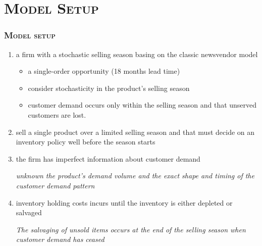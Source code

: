 \documentclass[aspectratio=169]{../presentation}
\begin{document}
    \section{\textsc{Model Setup}}

    \begin{frame}
        \frametitle{\textsc{Model setup}}

        \begin{enumerate}
            \item a firm with a stochastic selling season basing on the classic newsvendor model
            \begin{itemize}
                \scriptsize
                \item a single-order opportunity (18 months lead time)
                \item consider stochasticity in the product's selling season
                \item customer demand occurs only within the selling season and that unserved customers are lost.
            \end{itemize}
            \pause
            \item sell a single product over a limited selling season and that must decide on an inventory policy well before the season starts
            \pause
            \item the firm has imperfect information about customer demand

            {
                \scriptsize \textsl{
                    unknown the product's demand volume and the exact shape and timing of the customer demand pattern
                }
            }
            \pause
            \item inventory holding costs incurs until the inventory is either depleted or salvaged

            {
                \scriptsize \textsl{
                    The salvaging of unsold items occurs at the end of the selling season when customer demand has ceased
                }
            }
        \end{enumerate}

    \end{frame}
\end{document}
